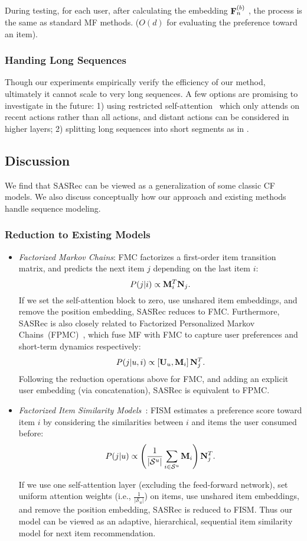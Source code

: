 \documentclass[conference]{IEEEtran}
\def\F{{\bf F}}
\def\M{{\bf M}}
\def\N{{\bf N}}
\def\U{{\bf U}}
\newcommand{\xhdr}[1]{\subsubsection*{\bf #1}}
\begin{document}
During testing, for each user, after calculating the embedding $\F_n^{(b)}$
, the 
process is the same as standard MF methods. ($O(d)$ for evaluating the preference toward an item).

\xhdr{Handing 
Long Sequences} Though our experiments empirically verify the efficiency of our method, ultimately it cannot scale to very long sequences. A few options are promising to 
investigate
in the future: 1) using 
restricted self-attention~\cite{poveytime} which only attends on
recent actions rather than all actions, and distant actions can be considered in higher layers; 2) splitting long sequences into short segments as in \cite{DBLP:conf/wsdm/TangW18}.






\subsection{Discussion}

We find
that
SASRec can be viewed as a generalization 
of some classic CF models. We also discuss 
conceptually
how our approach and existing methods handle sequence modeling.

\xhdr{Reduction to Existing Models}

\begin{itemize}
\item \emph{Factorized Markov Chains}: FMC factorizes a first-order item transition matrix, and predicts the next item $j$ depending on the last item $i$:
\[P(j|i)\propto\M_i^T\N_j.\]
If we set 
the
self-attention block to zero, use unshared item embeddings, and remove the position embedding, SASRec 
reduces
to FMC.
Furthermore, SASRec is also closely related to Factorized Personalized Markov Chains~(FPMC)~\cite{rendle2010fpmc}, which fuse MF with FMC to capture user preferences and short-term dynamics respectively:
\[P(j|u,i)\propto\left [\U_u,\M_i\right ]\N^T_j.\]
Following the reduction operations above for FMC, and adding an explicit user embedding (via concatenation), SASRec is equivalent to FPMC.



\item \emph{Factorized Item Similarity Models~\cite{kabbur2013fism}}: FISM estimates a preference score 
toward
item $i$ by considering the similarities between $i$ and items the user consumed before:
\[P(j|u)\propto\left (\frac{1}{|\mathcal{S}^u|}\sum_{i\in\mathcal{S}^u}\M_i\right)\N^T_j.\]

If we use 
one
self-attention layer (excluding the feed-forward network), set uniform attention weights (i.e., $\frac{1}{|\mathcal{S}_{u}|}$) on items, use unshared item embeddings, and remove the position embedding, SASRec is reduced to FISM. Thus our model can be viewed as an adaptive, hierarchical, sequential item similarity model for next item recommendation. 

\end{itemize}
\end{document}
